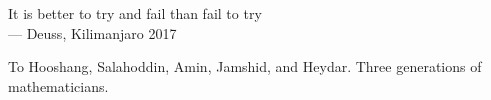 \cleardoublepage
\thispagestyle{empty}


\vspace*{3cm}

\begin{raggedleft}
    	It is better to try and fail than fail to try\\
     --- Deuss, Kilimanjaro 2017\\
\end{raggedleft}

\vspace{4cm}

\begin{center}
    To Hooshang, Salahoddin, Amin, Jamshid, and Heydar. Three generations of mathematicians.
\end{center}


